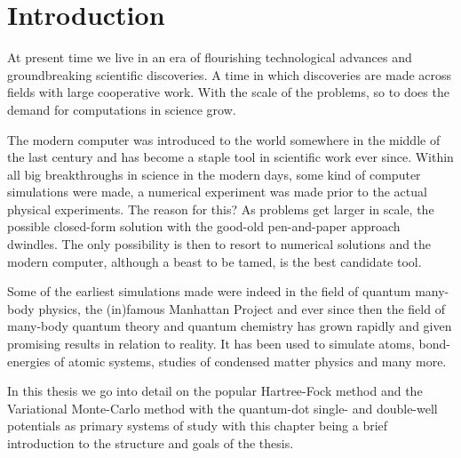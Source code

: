 \chapter{Introduction\label{chapter:1}}
    At present time we live in an era of flourishing technological advances and
    groundbreaking scientific discoveries. A time in which discoveries are made
    across fields with large cooperative work. With the scale of the problems,
    so to does the demand for computations in science grow.

    The modern computer was introduced to the world somewhere in the middle of
    the last century and has become a staple tool in scientific work ever
    since. Within all big breakthroughs in science in the modern days, some
    kind of computer simulations were made, a numerical experiment was made
    prior to the actual physical experiments. The reason for this? As problems
    get larger in scale, the possible closed-form solution with the good-old
    pen-and-paper approach dwindles. The only possibility is then to resort to
    numerical solutions and the modern computer, although a beast to be tamed,
    is the best candidate tool.

    Some of the earliest simulations made were indeed in the field of quantum
    many-body physics, the (in)famous Manhattan Project and ever since then the
    field of many-body quantum theory and quantum chemistry has grown rapidly
    and given promising results in relation to reality. It has been used to
    simulate atoms, bond-energies of atomic systems, studies of condensed
    matter physics and many more. 
    
    In this thesis we go into detail on the popular Hartree-Fock method and the
    Variational Monte-Carlo method with the quantum-dot single- and double-well
    potentials as primary systems of study with this chapter being a brief
    introduction to the structure and goals of the thesis.

